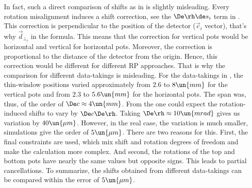 
In fact, such a direct comparison of shifts as in  is slightly misleading. Every rotation misalignment induces a shift correction, see the $\De\rh \de s_i$ term in . This correction is perpendicular to the position of the detector ($\vec c_i$ vector), that's why $\vec d_{\perp_i}$ in the formula. This means that the correction for vertical pots would be horizontal and vertical for horizontal pots. Moreover, the correction is proportional to the distance of the detector from the origin. Hence, this correction would be different for different RP approaches. That is why the comparison for different data-takings is misleading. For the data-takings in , the thin-window positions varied approximately from $2.6$ to $8\un{mm}$ for the vertical pots and from $2.3$ to $5.6\un{mm}$ for the horizontal pots. The span was, thus, of the order of $\De c \approx 4\un{mm}$. From the  one could expect the rotation-induced shifts to vary by $\De c \De \rh$. Taking $\De\rh \approx 10 \un{mrad}$ gives us variation by $40\un{\mu m}$. However, in the real case, the variation is much smaller, simulations give the order of $5\un{\mu m}$. There are two reasons for this. First, the final constraints are used, which mix shift and rotation degrees of freedom and make the calculation more complex. And second, the rotations of the top and bottom pots have nearly the same values but opposite signs. This leads to partial cancellations. To summarize, the shifts obtained from different data-takings can be compared within the error of $5\un{\mu m}$.

